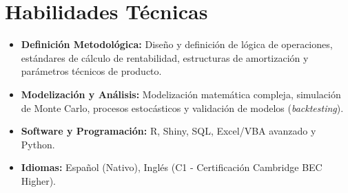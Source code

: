 \documentclass[a4paper,12pt]{article}
\begin{document}
\section{Habilidades Técnicas}
  \begin{itemize}[leftmargin=*,labelsep=0mm]
    \item[] \hspace{3.5ex} \textbf{Definición Metodológica:} \small{Diseño y definición de lógica de operaciones, estándares de cálculo de rentabilidad, estructuras de amortización y parámetros técnicos de producto.}
    
    \vspace{1mm}
    \item[] \hspace{3.5ex} \textbf{Modelización y Análisis:} \small{Modelización matemática compleja, simulación de Monte Carlo, procesos estocásticos y validación de modelos (\textit{backtesting}).}
    
    \vspace{1mm}
    \item[] \hspace{3.5ex} \textbf{Software y Programación:} \small{R, Shiny, SQL, Excel/VBA avanzado y Python.}
    
    \vspace{1mm}
    \item[] \hspace{3.5ex} \textbf{Idiomas:} \small{Español (Nativo), Inglés (C1 - Certificación Cambridge BEC Higher).}
  \end{itemize}
\end{document}
